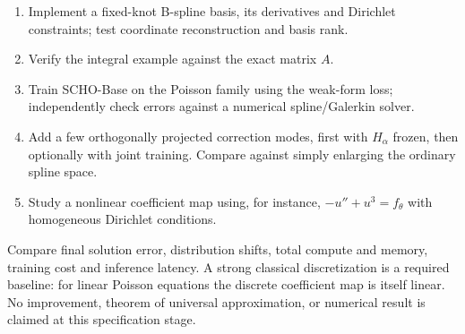 \begin{enumerate}
  \item Implement a fixed-knot B-spline basis, its derivatives and
        Dirichlet constraints; test coordinate reconstruction and basis rank.
  \item Verify the integral example against the exact matrix $A$.
  \item Train SCHO-Base on the Poisson family using the weak-form loss;
        independently check errors against a numerical spline/Galerkin solver.
  \item Add a few orthogonally projected correction modes, first with
        $H_\alpha$ frozen, then optionally with joint training.
        Compare against simply enlarging the ordinary spline space.
  \item Study a nonlinear coefficient map using, for instance,
        $-u''+u^3=f_\theta$ with homogeneous Dirichlet conditions.
\end{enumerate}
Compare final solution error, distribution shifts, total compute and
memory, training cost and inference latency. A strong classical
discretization is a required baseline: for linear Poisson equations
the discrete coefficient map is itself linear. No improvement,
theorem of universal approximation, or numerical result is claimed
at this specification stage.

